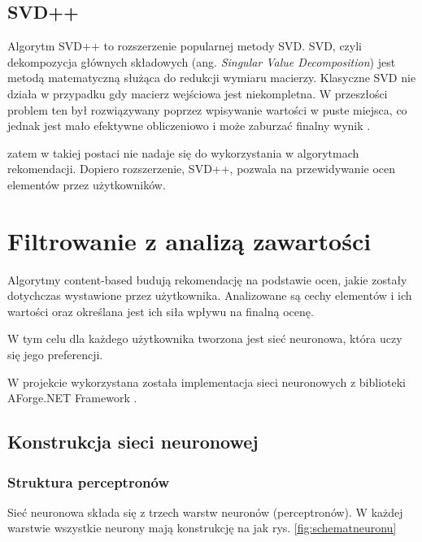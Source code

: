 \documentclass[twoside]{iisthesis}
\begin{document}
		 \subsection{SVD++}
		 
		 
		 Algorytm SVD++ to rozszerzenie popularnej metody SVD. SVD, czyli dekompozycja głównych składowych (ang. \textit{Singular Value Decomposition}) jest metodą matematyczną służąca do redukcji wymiaru macierzy. Klasyczne SVD nie działa w przypadku gdy macierz wejściowa jest niekompletna. W przeszłości problem ten był rozwiązywany poprzez wpisywanie wartości w puste miejsca, co jednak jest mało efektywne obliczeniowo i może zaburzać finalny wynik \cite{sarwar2000application}\cite{koren2009matrix}.  
		  
		  zatem w takiej postaci nie nadaje się do wykorzystania w algorytmach rekomendacji. Dopiero rozszerzenie, SVD++, pozwala na przewidywanie ocen elementów przez użytkowników. 
		 
		 
		 
	 \section{Filtrowanie z analizą zawartości}
	 
		 Algorytmy content-based budują rekomendację na podstawie ocen, jakie zostały dotychczas wystawione przez użytkownika. Analizowane są cechy elementów i ich wartości oraz określana jest ich siła wpływu na finalną ocenę. 
		 
		 W tym celu dla każdego użytkownika tworzona jest sieć neuronowa, która uczy się jego preferencji. 
		 
		 W projekcie wykorzystana została implementacja sieci neuronowych z biblioteki AForge.NET Framework \cite{aforgenet}.
	 
		 \subsection{Konstrukcja sieci neuronowej}
		 
		 \subsubsection{Struktura perceptronów}
		 \label{sss:strukturaperceptronow}
		 
		 Sieć neuronowa składa się z trzech warstw neuronów (perceptronów). W każdej warstwie wszystkie neurony mają konstrukcję na jak rys. \ref{fig:schematneuronu}
		 
\end{document}
